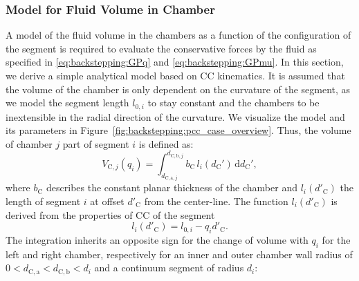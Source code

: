 \subsubsection{Model for Fluid Volume in Chamber}
A model of the fluid volume in the chambers as a function of the configuration of the segment is required to evaluate the conservative forces by the fluid as specified in \eqref{eq:backstepping:GPq} and \eqref{eq:backstepping:GPmu}. In this section, we derive a simple analytical model based on \gls{CC} kinematics.
It is assumed that the volume of the chamber is only dependent on the curvature of the segment, as we model the segment length $l_{0,i}$ to stay constant and the chambers to be inextensible in the radial direction of the curvature. We visualize the model and its parameters in Figure~\ref{fig:backstepping:pcc_case_overview}. Thus, the volume of chamber $j$ part of segment $i$ is defined as:
\begin{equation}
    V_{\mathrm{C},j}(q_i) = \int_{d_{\mathrm{C},\mathrm{a},j}}^{d_{\mathrm{C},\mathrm{b},j}} b_\mathrm{C} \, l_i(d_\mathrm{C}') \, \mathrm{d}d_\mathrm{C}',
\end{equation}
where $b_\mathrm{C}$ describes the constant planar thickness of the chamber and $l_i(d'_\mathrm{C})$ the length of segment $i$ at offset $d'_\mathrm{C}$ from the center-line. 
The function $l_i(d'_\mathrm{C})$ is derived from the properties of \gls{CC} of the segment
\begin{equation}
    l_i(d'_\mathrm{C}) = l_{0,i} - q_i d'_\mathrm{C}.
\end{equation}
The integration inherits an opposite sign for the change of volume with $q_i$ for the left and right chamber, respectively for an inner and outer chamber wall radius of $0 < d_{\mathrm{C},\mathrm{a}} < d_{\mathrm{C},\mathrm{b}} < d_i$ and a continuum segment of radius $d_i$:
